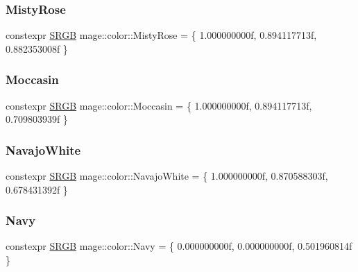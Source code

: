 \hypertarget{namespacemage_1_1color_a56bd7d93171c5b2b37db31ac93faf217}{}\label{namespacemage_1_1color_a56bd7d93171c5b2b37db31ac93faf217} 
\subsubsection{\texorpdfstring{Misty\+Rose}{MistyRose}}
{\footnotesize\ttfamily constexpr \hyperlink{structmage_1_1_s_r_g_b}{S\+R\+GB} mage\+::color\+::\+Misty\+Rose = \{ 1.\+000000000f, 0.\+894117713f, 0.\+882353008f \}}

\hypertarget{namespacemage_1_1color_a7a4d383ae38d238a02a8c21c0919ebf2}{}\label{namespacemage_1_1color_a7a4d383ae38d238a02a8c21c0919ebf2} 
\subsubsection{\texorpdfstring{Moccasin}{Moccasin}}
{\footnotesize\ttfamily constexpr \hyperlink{structmage_1_1_s_r_g_b}{S\+R\+GB} mage\+::color\+::\+Moccasin = \{ 1.\+000000000f, 0.\+894117713f, 0.\+709803939f \}}

\hypertarget{namespacemage_1_1color_a202ec8025686185d9f389c91abddb72a}{}\label{namespacemage_1_1color_a202ec8025686185d9f389c91abddb72a} 
\subsubsection{\texorpdfstring{Navajo\+White}{NavajoWhite}}
{\footnotesize\ttfamily constexpr \hyperlink{structmage_1_1_s_r_g_b}{S\+R\+GB} mage\+::color\+::\+Navajo\+White = \{ 1.\+000000000f, 0.\+870588303f, 0.\+678431392f \}}

\hypertarget{namespacemage_1_1color_ac30ea52200abf8c5a69628560ae8016a}{}\label{namespacemage_1_1color_ac30ea52200abf8c5a69628560ae8016a} 
\subsubsection{\texorpdfstring{Navy}{Navy}}
{\footnotesize\ttfamily constexpr \hyperlink{structmage_1_1_s_r_g_b}{S\+R\+GB} mage\+::color\+::\+Navy = \{ 0.\+000000000f, 0.\+000000000f, 0.\+501960814f \}}


